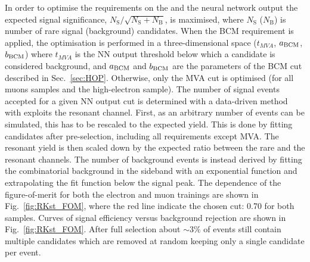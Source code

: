 In order to optimise the requirements on the \mbcm and the neural network output the expected
signal significance, $N_{\mathrm{S}}/\sqrt{N_{\mathrm{S}}+N_{\mathrm{B}}}$, is maximised,
where $N_\mathrm{S}$ ($N_\mathrm{B}$) is number of rare signal (background) candidates.
When the BCM requirement is applied, the optimisation is performed in a three-dimensional space
($t_{MVA}$, $a_{\rm BCM}$, $b_{\rm BCM}$) where $t_{MVA}$ is the NN output threshold below which
a candidate is considered background, and $a_{\rm BCM}$ and $b_{\rm BCM}$ are the parameters of the BCM
cut described in Sec.~\ref{sec:HOP}. Otherwise, only the MVA cut is optimised (for all muons samples and the high-\qsq electron sample).
%
The number of signal events accepted for a given NN output cut is determined with a data-driven method
with exploits the resonant channel. First, as an arbitrary number of events can be simulated, this has to be rescaled
to the expected yield. This is done by fitting \decay{\Bz}{\Kstarz(\jpsi\to\ll)} candidates after pre-selection,
including all requirements except MVA. The resonant yield is then scaled down by the expected ratio between
the rare and the resonant channels. The number of background events is instead derived by fitting the combinatorial
background in the sideband with an exponential function and extrapolating the fit function below the signal peak.
%
The dependence of the figure-of-merit for both the electron and muon trainings
are shown in Fig.~\ref{fig:RKst_FOM}, where the red line indicate the chosen cut: 0.70 for both samples.
Curves of signal efficiency versus background rejection are shown in Fig.~\ref{fig:RKst_FOM}.
%
%
After full selection about $\sim 3\%$ of events still contain multiple candidates
which are removed at random keeping only a single candidate per event.
%
